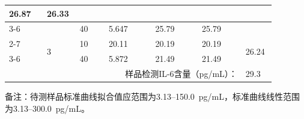 \documentclass[UTF8,10pt,a4paper,fontset=fandol]{ctexart}
\newcommand{\fieldvalue}[1]{#1}
\newcommand{\handwritten}[1]{#1}
\begin{document}
\begin{tabular}{|p{0.13\linewidth}|p{0.09\linewidth}|p{0.10\linewidth}|p{0.16\linewidth}|p{0.16\linewidth}|p{0.15\linewidth}|p{0.09\linewidth}|}
\fieldvalue{\handwritten{26.87}} &
\multirow{2}{*}{%
\fieldvalue{\handwritten{26.33}}}\\
\cline{3-6}
& &%
\fieldvalue{\handwritten{40}} &
\fieldvalue{\handwritten{5.647}} &
\fieldvalue{\handwritten{25.79}} &
\fieldvalue{\handwritten{25.79}} &
\\
\cline{2-7}
& \multirow{2}{*}{3} &
\fieldvalue{\handwritten{10}} &
\fieldvalue{\handwritten{20.11}} &
\fieldvalue{\handwritten{20.19}} &
\fieldvalue{\handwritten{20.19}} &
\multirow{2}{*}{%
\fieldvalue{\handwritten{26.24}}}\\
\cline{3-6}
& &%
\fieldvalue{\handwritten{40}} &
\fieldvalue{\handwritten{5.872}} &
\fieldvalue{\handwritten{21.49}} &
\fieldvalue{\handwritten{21.49}} &
\\
\hline
\multicolumn{6}{|r|}{样品检测IL-6含量（pg/mL）：} &
\fieldvalue{\handwritten{29.3}}\\
\hline
\end{tabular}

\normalsize

备注：待测样品标准曲线拟合值应范围为3.13--150.0~pg/mL，标准曲线线性范围为3.13--300.0~pg/mL。
\end{document}
